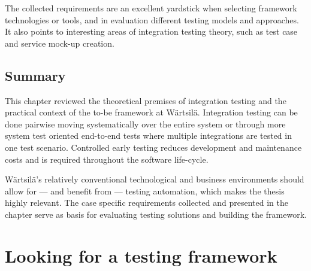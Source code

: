 \documentclass[12pt,a4paper,oneside,pdftex]{report}
\begin{document}
The collected requirements are an excellent yardstick when selecting framework technologies or tools, and in evaluation different testing models and approaches. It also points to interesting areas of integration testing theory, such as test case and service mock-up creation.

\section{Summary}

This chapter reviewed the theoretical premises of integration testing and the practical context of the to-be framework at Wärtsilä. Integration testing can be done pairwise moving systematically over the entire system or through more system test oriented end-to-end tests where multiple integrations are tested in one test scenario. Controlled early testing reduces development and maintenance costs and is required throughout the software life-cycle.

Wärtsilä's relatively conventional technological and business environments should allow for --- and benefit from --- testing automation, which makes the thesis highly relevant. The case specific requirements collected and presented in the chapter serve as basis for evaluating testing solutions and building the framework.

\chapter{Looking for a testing framework}
\label{chapter:frameworktheory}

\begin{comment}
structured and linear scripts
shared scripts = modular scripts
Datadriven scripts = scritps with input seprated so script can be reused with any input
    complicates, requires programming and initial investment
Keyworddriven scritps = another layer, construct data files with keywrods how to input data

test materials in logical sets = tests suites
1-100, no rules as how are divided

test sets combined into test suites, specific task like test for a bug or a system testing for a range of products

test results include outcomes, difference reports and tes tool log
byproducts give an audit trail

what is to measured number of scripts, automated tests, time to run, time or effor to maintenance
number of test faulires, passet tests, coverage, bytes

defect detection percentage ddp = defects found by testing/total known defects

coverage terms include statements, decisions or branches, conditions, condition combinations, data definition-use pairs, linear code sequence and jumps, module calls

maintainability, efficeincy, reliability, flixibility, usability, robustyness, portability 

\end{comment}
\end{document}
